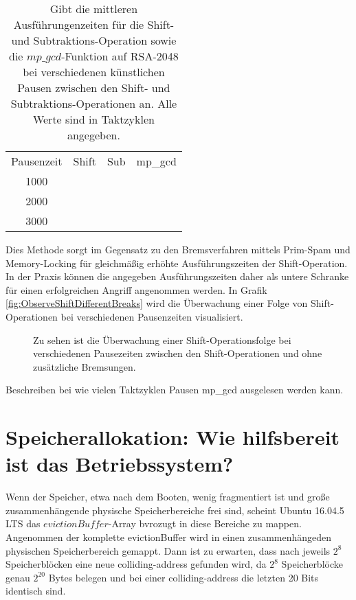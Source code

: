 \begin{table}[h]
\caption{Gibt die mittleren Ausführungenzeiten für die Shift- und Subtraktions-Operation sowie die $mp\_gcd$-Funktion auf RSA-2048 bei verschiedenen künstlichen Pausen zwischen den Shift- und Subtraktions-Operationen an. Alle Werte sind in Taktzyklen angegeben.}
\label{tbl:ArtificialBreaksMeanExecutionTime}
\begin{tabular}{cccc}
Pausenzeit & Shift & Sub & mp\_gcd \\
1000       &       &     &         \\
2000       &       &     &         \\
3000       &       &     &        
\end{tabular}
\end{table}

Dies Methode sorgt im Gegensatz zu den Bremsverfahren mittels Prim-Spam und Memory-Locking für gleichmäßig erhöhte Ausführungszeiten der Shift-Operation.
In der Praxis können die angegeben Ausführungszeiten daher als untere Schranke für einen erfolgreichen Angriff angenommen werden.
In Grafik \ref{fig:ObserveShiftDifferentBreaks} wird die Überwachung einer Folge von Shift-Operationen bei verschiedenen Pausenzeiten visualisiert.

\label{fig:ObserveShiftDifferentBreaks}
\begin{figure}[h]
\centering
\begin{scaletikzpicturetowidth}{\textwidth}
%
\end{scaletikzpicturetowidth}
\caption{Zu sehen ist die Überwachung einer Shift-Operationsfolge bei verschiedenen Pausezeiten zwischen den Shift-Operationen und ohne zusätzliche Bremsungen.}
\end{figure}



Beschreiben bei wie vielen Taktzyklen Pausen mp_gcd ausgelesen werden kann.

\section{Speicherallokation: Wie hilfsbereit ist das Betriebssystem?}

Wenn der Speicher, etwa nach dem Booten, wenig fragmentiert ist und große zusammenhängende physische Speicherbereiche frei sind, scheint Ubuntu 16.04.5 LTS das $evictionBuffer$-Array bvrozugt in diese Bereiche zu mappen.
Angenommen der komplette evictionBuffer wird in einen zusammenhängeden physischen Speicherbereich gemappt. Dann ist zu erwarten, dass nach jeweils $2^8$ Speicherblöcken eine neue colliding-address gefunden wird, da $2^8$ Speicherblöcke genau $2^{20}$ Bytes belegen und bei einer colliding-address die letzten 20 Bits identisch sind.

